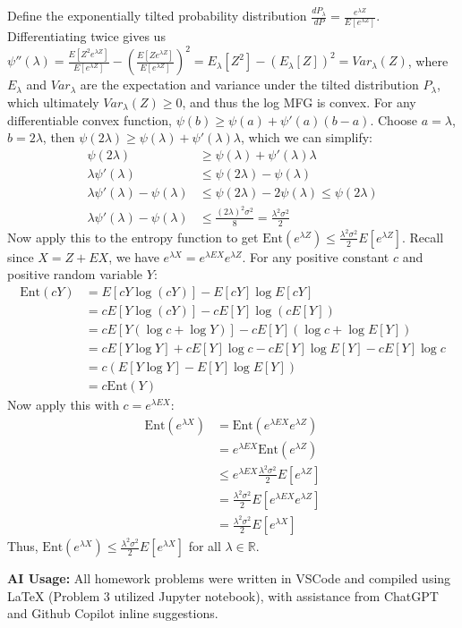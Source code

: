 \documentclass[11pt,a4paper,margin=1in]{article}
\begin{document}
\noindent
Define the exponentially tilted probability distribution $\frac{dP_\lambda}{dP} = \frac{e^{\lambda Z}}{E[e^{\lambda Z}]}$.
Differentiating twice gives us $\psi''(\lambda) = \frac{E[Z^2e^{\lambda Z}]}{E[e^{\lambda Z}]} - \left(\frac{E[Ze^{\lambda Z}]}{E[e^{\lambda Z}]}\right)^2 = E_\lambda[Z^2] - (E_\lambda[Z])^2 = Var_\lambda(Z)$, 
where $E_\lambda$ and $Var_\lambda$ are the expectation and variance under the 
tilted distribution $P_\lambda$, which ultimately $Var_\lambda(Z) \geq 0$, and thus
the log MFG is convex. For any differentiable convex function, $\psi(b) \geq \psi(a) + \psi'(a)(b - a)$.
Choose $a = \lambda$, $b = 2\lambda$, then $\psi(2\lambda) \geq \psi(\lambda) + \psi'(\lambda)\lambda$, 
which we can simplify:
\begin{align*}
    \psi(2\lambda) &\geq \psi(\lambda) + \psi'(\lambda)\lambda \\
    \lambda\psi'(\lambda) &\leq \psi(2\lambda) - \psi(\lambda) \\
    \lambda\psi'(\lambda) - \psi(\lambda) &\leq \psi(2\lambda) - 2\psi(\lambda) \leq \psi(2\lambda) \\
    \lambda\psi'(\lambda) - \psi(\lambda) &\leq \frac{(2\lambda)^2\sigma^2}{8} = \frac{\lambda^2\sigma^2}{2}
\end{align*}
Now apply this to the entropy function to get $\text{Ent}(e^{\lambda Z}) \leq \frac{\lambda^2\sigma^2}{2}E[e^{\lambda Z}]$.
Recall since $X = Z + EX$, we have $e^{\lambda X} = e^{\lambda EX}e^{\lambda Z}$.
For any positive constant $c$ and positive random variable $Y$:
\begin{align*}
    \text{Ent}(cY) &= E[cY\log(cY)] - E[cY]\log E[cY] \\
    &= cE[Y\log(cY)] - cE[Y]\log(cE[Y]) \\
    &= cE[Y(\log c + \log Y)] - cE[Y](\log c + \log E[Y]) \\
    &= cE[Y\log Y] + cE[Y]\log c - cE[Y]\log E[Y] - cE[Y]\log c \\
    &= c(E[Y\log Y] - E[Y]\log E[Y]) \\
    &= c\text{Ent}(Y)
\end{align*}
Now apply this with $c = e^{\lambda EX}$:
\begin{align*}
    \text{Ent}(e^{\lambda X}) &= \text{Ent}(e^{\lambda EX}e^{\lambda Z}) \\
    &= e^{\lambda EX}\text{Ent}(e^{\lambda Z}) \\
    &\leq e^{\lambda EX}\frac{\lambda^2\sigma^2}{2}E[e^{\lambda Z}] \\
    &= \frac{\lambda^2\sigma^2}{2}E[e^{\lambda EX}e^{\lambda Z}] \\
    &= \frac{\lambda^2\sigma^2}{2}E[e^{\lambda X}]
\end{align*}
Thus, $\text{Ent}(e^{\lambda X}) \leq \frac{\lambda^2\sigma^2}{2}E[e^{\lambda X}]$ 
for all $\lambda \in \mathbb{R}$.

\noindent 
\textbf{AI Usage:} All homework problems were written in VSCode and compiled using LaTeX
(Problem 3 utilized Jupyter notebook), with assistance from ChatGPT and Github 
Copilot inline suggestions.
\end{document}
